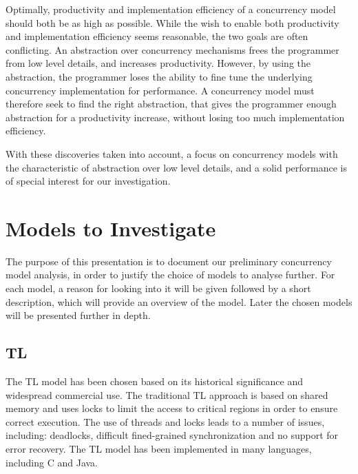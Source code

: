 Optimally, productivity and implementation efficiency of a concurrency model should both be as high as possible. While the wish to enable both productivity and implementation efficiency seems reasonable, the two goals are often conflicting. An abstraction over concurrency mechanisms frees the programmer from low level details, and increases productivity. However, by using the abstraction, the programmer loses the ability to fine tune the underlying concurrency implementation for performance. A concurrency model must therefore seek to find the right abstraction, that gives the programmer enough abstraction for a productivity increase, without losing too much implementation efficiency.

With these discoveries taken into account, a focus on concurrency models with the characteristic of abstraction over low level details, and a solid performance is of special interest for our investigation.

\section{Models to Investigate}

The purpose of this presentation is to document our preliminary concurrency model analysis, in order to justify the choice of models to analyse further. For each model, a reason for looking into it will be given followed by a short description, which will provide an overview of the model. Later the chosen models will be presented further in depth.

\subsection{\acl{TL}}
The \ac{TL} model has been chosen based on its historical significance and widespread commercial use\cite[p. 58]{sutter2005software}. The traditional \ac{TL} approach is based on shared memory and uses locks to limit the access to critical regions in order to ensure correct execution\cite[p. 1]{saha2006mcrt}. The use of threads and locks leads to a number of issues, including: deadlocks, difficult fined-grained synchronization and no support for error recovery\cite[p. 187]{saha2006mcrt}. The \ac{TL} model has been implemented in many languages, including C and Java. 

